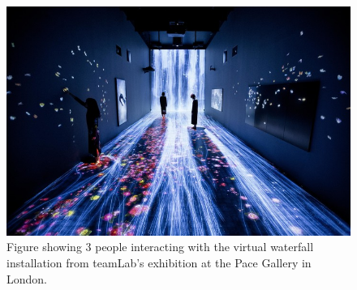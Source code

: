     \begin{figure}[H]
    	\centering
    	\includegraphics[width=0.9\linewidth]{figure/Analysis/transcendingBoundaries.jpg}
    	\caption{Figure showing 3 people interacting with the virtual waterfall installation from teamLab's exhibition at the Pace Gallery in London\cite{transcendingBoundries}.}
    	\label{fig:transcendingBoundaries}
    \end{figure}
    
